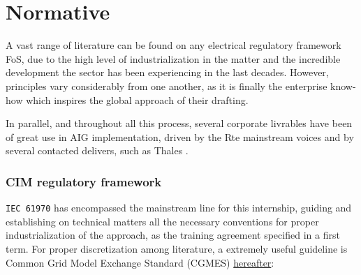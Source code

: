 \section{Normative}
\label{sub:AIG:normative}

A vast range of literature can be found on any electrical regulatory framework FoS, due to the high level of industrialization in the matter and the incredible development the sector has been experiencing in the last decades. However, principles vary considerably from one another, as it is finally the enterprise know-how which inspires the global approach of their drafting.

In parallel, and throughout all this process, several corporate livrables have been of great use in AIG implementation, driven by the Rte mainstream voices \cite{guide_GAI,Infos_GAI,specif_detaillees_GAI} and by several contacted delivers, such as Thales \cite{gai_thales}.

\subsubsection{CIM regulatory framework}
\label{subsub:AIG:noramtive:CIM-framework}
\texttt{IEC 61970} has encompassed the mainstream line for this internship, guiding and establishing on technical matters all the necessary conventions for proper industrialization of the approach, as the training agreement specified in a first term.
For proper discretization among literature, a extremely useful guideline is Common Grid Model Exchange Standard (CGMES)   \href{https://docstore.entsoe.eu/Documents/CIM_documents/Grid_Model_CIM/140528_ENTSOE_CGMES_v2.4.14.pdf}{hereafter}:

